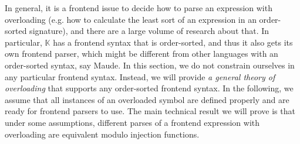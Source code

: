 \documentclass[UTF8,11pt]{article}
\theoremstyle{plain}
\theoremstyle{definition}
\theoremstyle{remark}
\newcommand{\K}{\mbox{$\mathbb{K}$}\xspace}
\begin{document}
In general, it is a frontend issue to decide how to parse an expression with 
overloading (e.g. how to calculate the least sort of an expression in an 
order-sorted signature), and there 
are a large volume of research about that.
In particular, \K has a frontend syntax that is order-sorted, and thus it also 
gets its own frontend parser, which might be different from other languages 
with an order-sorted syntax, say Maude.
In this section, we do not constrain ourselves in any particular frontend 
syntax.
Instead, we will provide \emph{a general theory of overloading} that supports 
any order-sorted frontend syntax.
In the following, we assume that all instances of an overloaded symbol are 
defined properly and are ready for frontend parsers to use.
The main technical result we will prove is that under some assumptions, 
different parses of a frontend expression with overloading are equivalent 
modulo injection functions.
\end{document}
